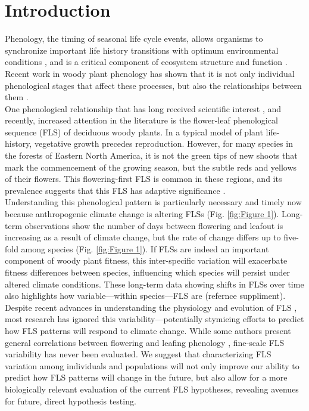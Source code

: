 \documentclass{article}
\begin{document}
\section*{Introduction}
Phenology, the timing of seasonal life cycle events, allows organisms to synchronize important life history transitions with optimum environmental conditions \citep{Forrest2010}, and is a critical component of ecosystem structure and function \citep{Cleland2007,Piao2007}. Recent work in woody plant phenology has shown that it is not only individual phenological stages that affect these processes, but also the relationships between them \citep{Ettinger2018}.\\

 One phenological relationship that has long received scientific interest \citep[see][]{Robertson1895}, and recently, increased attention in the literature \citep{Savage2019, Gougherty2018} is the flower-leaf phenological sequence (FLS) of deciduous woody plants. In a typical model of plant life-history, vegetative growth precedes reproduction. However, for many species in the forests of Eastern North America, it is not the green tips of new shoots that mark the commencement of the growing season, but the subtle reds and yellows of their flowers. This flowering-first FLS is common in these regions, and its prevalence suggests that this FLS has adaptive significance \citep{Rathcke_1985}.\\ 

 Understanding this phenological pattern is particularly necessary and timely now because anthropogenic climate change is altering FLSs (Fig. \ref{fig:Figure 1}). Long-term observations show the number of days between flowering and leafout is increasing as a result of climate change, but the rate of change differs up to five-fold among species (Fig. \ref{fig:Figure 1}).  If FLSs are indeed an important component of woody plant fitness, this inter-specific variation will exacerbate fitness differences between species, influencing which species will persist under altered climate conditions. These long-term data showing shifts in FLSs over time also highlights how variable---within species---FLS are (refernce suppliment). \\

 Despite recent advances in understanding the physiology and evolution of FLS \citep{Gougherty2018,Savage2019}, most research has ignored this variability---potentially stymieing efforts to predict how FLS patterns will respond to climate change. While some authors present general correlations between flowering and leafing phenology \citep{Lechowicz_1995, Ettinger2018}, fine-scale FLS variability has never been evaluated. We suggest that characterizing FLS variation among individuals and populations will not only improve our ability to predict how FLS patterns will change in the future, but also allow for a more biologically relevant evaluation of the current FLS hypotheses, revealing avenues for future, direct hypothesis testing.\\
\end{document}

